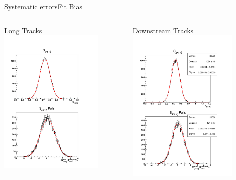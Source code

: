 \documentclass{beamer}
\begin{document}
	\begin{frame}{Systematic errors}{Fit Bias}
	\begin{columns}
	\begin{block}{Long Tracks}
	\centering
	\includegraphics[width=0.8\textwidth]{fit_bias_lt}	
	\end{block}
	\begin{block}{Downstream Tracks}
	\centering
	\includegraphics[width=0.8\textwidth]{fit_bias_ds}

\end{block}
\end{columns}
\end{frame}
\end{document}
